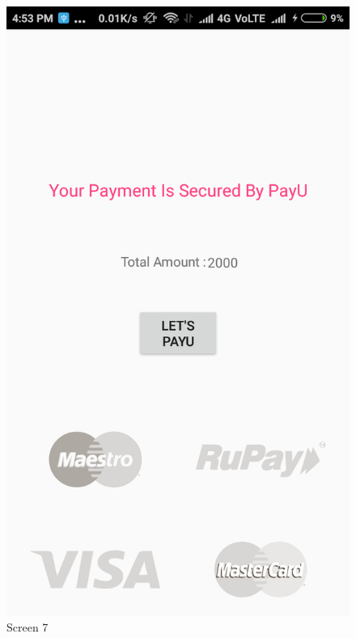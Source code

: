 \begin{figure}[ht]
\centering
\includegraphics[scale=0.30]{images/9.png}
\caption{Screen 7}
\end{figure}

\newpage

